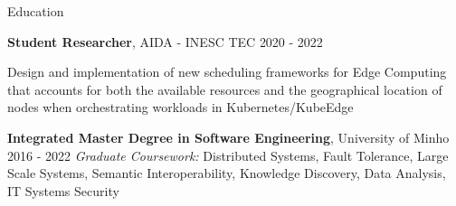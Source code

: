 \documentclass{resume}
\begin{document}

\begin{rSection}{Education}

\begin{rSubsection}
{\textbf{Student Researcher}, AIDA - INESC TEC \href{https://www.inesctec.pt/en/projects/aida}{\faLink}}{2020 - 2022}{}{}

Design and implementation of new scheduling frameworks for Edge Computing that accounts for both the available resources and the geographical location of nodes when orchestrating workloads in Kubernetes/KubeEdge

\end{rSubsection}

\begin{rSubsection}
{\textbf{Integrated Master Degree in Software Engineering}, University of Minho \href{https://www.uminho.pt/EN}{\faLink}}{2016 - 2022}{}{}
\textit{Graduate Coursework:} Distributed Systems, Fault Tolerance, Large Scale Systems, Semantic Interoperability, Knowledge Discovery, Data Analysis, IT Systems Security
\end{rSubsection}

\end{rSection}

\end{document}
